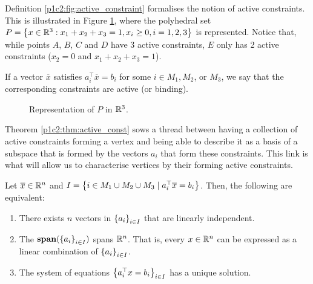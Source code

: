Definition \ref{p1c2:fig:active_constraint} formalises the notion of active constraints. This is illustrated in Figure \ref{p1c2:fig:active_constraints}, where the polyhedral set $P = \left\{ x \in \mathbb{R}^3 : x_1 + x_2 + x_3 = 1, x_i \geq 0, i =1,2,3 \right \}$ is represented. Notice that, while points $A$, $B$, $C$ and $D$ have 3 active constraints, $E$ only has 2 active constraints ($x_2 = 0$ and $x_1 + x_2 + x_3 = 1$).

\begin{definition} \label{p1c2:fig:active_constraint}
	If a vector $\overline{x}$ satisfies $a_i^\top \overline{x} = b_i$ for some $i \in M_1, M_2$, or $M_3$, we say that the corresponding constraints are active (or binding).
\end{definition}

\begin{figure}[h]
	\caption{Representation of $P$ in $\mathbb{R}^3$.} \label{p1c2:fig:active_constraints}
\end{figure}	


Theorem \ref{p1c2:thm:active_const} sows a thread between having a collection of active constraints forming a vertex and being able to describe it as a basis of a subspace that is formed by the vectors $a_i$ that form these constraints. This link is what will allow us to characterise vertices by their forming active constraints.

\begin{theorem}\label{p1c2:thm:active_const}
	Let $\overline{x} \in \mathbb{R}^n$ and $I = \left\{  i \in M_1 \cup M_2 \cup M_3 \mid a_i^\top \overline{x} = b_i \right \}$. Then, the following are equivalent:
	\begin{enumerate}
		\item There exists $n$ vectors in $\left\{ a_i \right \}_{i \in I}$ that are linearly independent.  
		\item The $\mathop{\bf span}(\left\{ a_i \right \}_{i \in I})$ spans $\mathbb{R}^n$. That is, every $x \in \mathbb{R}^n$ can be expressed as a linear combination of $\left\{ a_i \right \}_{i \in I}$.
		\item The system of equations $\left\{ a_i ^\top x = b_i \right \}_{i \in I}$ has a unique solution.
	\end{enumerate}
\end{theorem}

